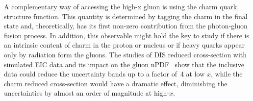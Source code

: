A complementary way of accessing the high-x gluon is using the charm quark structure function. This quantity is determined by tagging the charm in the final state and, theoretically, has its first non-zero contribution from the photon-gluon fusion process. In addition, this observable might hold the key to study if there is an intrinsic content of charm in the proton or nucleus or if heavy quarks appear only by radiation form the gluons. The studies of DIS reduced cross-section with simulated EIC data and its impact on the gluon nPDF~\cite{PhysRevD.96.114005} show that the inclusive data could reduce the uncertainty bands up to a factor of~4 at low $x$, while the charm reduced cross-section would have a dramatic effect, diminishing the uncertainties by almost an order of magnitude at high-$x$.   





%



